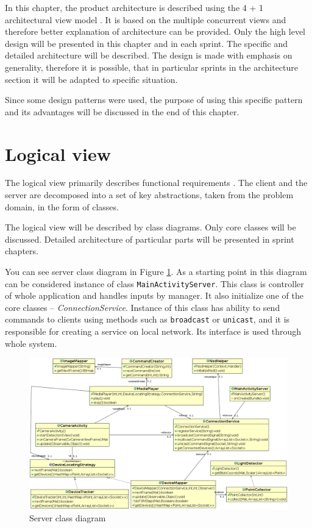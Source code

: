 In this chapter, the product architecture is described using the 4 + 1 architectural view model \cite{Kruchten:1995:VMA:624610.625529}. It is based on the multiple concurrent views and therefore better explanation of architecture can be provided.
Only the high level design will be presented in this chapter and in each sprint. The specific and detailed architecture will be described.
The design is made with emphasis on generality, therefore it is possible, that in particular sprints in the architecture section it will be adapted to specific situation.

Since some design patterns were used, the purpose of using this specific pattern and its advantages will be discussed in the end of this chapter.

\section{Logical view}
The logical view  primarily describes functional requirements \cite[p.~3]{Kruchten:1995:VMA:624610.625529}. 
The client and the server are decomposed into a set of key abstractions, taken from the problem domain, in the form of classes. 

The logical view will be described by class diagrams.
Only core classes will be discussed. 
Detailed architecture of particular parts will be presented in sprint chapters.

You can see server class diagram in Figure \ref{fig:architecture_class_diagram_server}.
As a starting point in this diagram can be considered instance of class \texttt{MainActivityServer}.
This class is controller of whole application and handles inputs by manager.
It also initialize one of the core classes -- \emph{ConnectionService}.
Instance of this class has ability to send commands to clients using methods such as \texttt{broadcast} or \texttt{unicast}, and it is responsible for creating a service on local network.
Its interface is used through whole system.
\begin{figure}[!h]
	\centering
		\includegraphics[width=20cm, angle=90]{softwareArchitecture/class_diagram_server.png}
	\caption{Server class diagram}
	\label{fig:architecture_class_diagram_server}
\end{figure}

